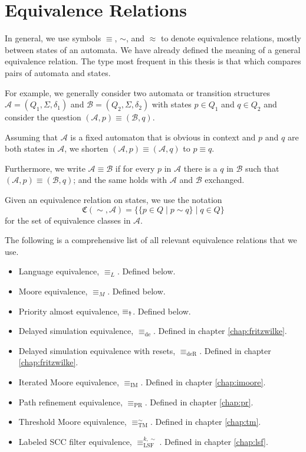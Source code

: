 \section{Equivalence Relations}

In general, we use symbols $\equiv$, $\sim$, and $\approx$ to denote equivalence relations, mostly between states of an automata. We have already defined the meaning of a general equivalence relation. The type most frequent in this thesis is that which compares pairs of automata and states.

For example, we generally consider two automata or transition structures $\mathcal{A} = (Q_1, \Sigma, \delta_1)$ and $\mathcal{B} = (Q_2, \Sigma, \delta_2)$ with states $p \in Q_1$ and $q \in Q_2$ and consider the question $(\mathcal{A}, p) \equiv (\mathcal{B}, q)$.

Assuming that $\mathcal{A}$ is a fixed automaton that is obvious in context and $p$ and $q$ are both states in $\mathcal{A}$, we shorten $(\mathcal{A}, p) \equiv (\mathcal{A}, q)$ to $p \equiv q$.
	
Furthermore, we write $\mathcal{A} \equiv \mathcal{B}$ if for every $p$ in $\mathcal{A}$ there is a $q$ in $\mathcal{B}$ such that $(\mathcal{A}, p) \equiv (\mathcal{B}, q)$; and the same holds with $\mathcal{A}$ and $\mathcal{B}$ exchanged.

\begin{defn}
	Given an equivalence relation on states, we use the notation $$\mathfrak{C}(\sim, \mathcal{A}) = \{ \{ p \in Q \mid p \sim q \} \mid q \in Q \}$$ for the set of equivalence classes in $\mathcal{A}$.
\end{defn}

\vspace{10pt}
The following is a comprehensive list of all relevant equivalence relations that we use.

\begin{itemize}
	\item Language equivalence, $\equiv_L$. Defined below.
	\item Moore equivalence, $\equiv_M$. Defined below.
	\item Priority almost equivalence, $\equiv_\text{\Ankh}$. Defined below.
	\item Delayed simulation equivalence, $\equiv_\text{de}$. Defined in chapter \ref{chap:fritzwilke}.
	\item Delayed simulation equivalence with resets, $\equiv_\text{deR}$. Defined in chapter \ref{chap:fritzwilke}.
	\item Iterated Moore equivalence, $\equiv_\text{IM}$. Defined in chapter \ref{chap:imoore}.
	\item Path refinement equivalence, $\equiv_\text{PR}$. Defined in chapter \ref{chap:pr}.
	\item Threshold Moore equivalence, $\equiv_\text{TM}^\sim$. Defined in chapter \ref{chap:tm}.
	\item Labeled SCC filter equivalence, $\equiv_\text{LSF}^{k,\sim}$. Defined in chapter \ref{chap:lsf}.
\end{itemize}

